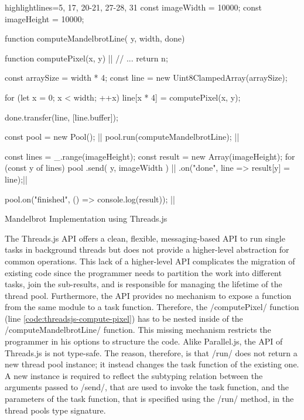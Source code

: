 \begin{listing}
	\begin{javascriptcode*}{highlightlines={5, 17, 20-21, 27-28, 31}}
const imageWidth = 10000;
const imageHeight = 10000;

function computeMandelbrotLine({ y, width}, done) {
	function computePixel(x, y) {|$\label{code:threadsjs-compute-pixel}$|
		// ...
		return n;
	}
	
	const arraySize = width * 4;
	const line = new Uint8ClampedArray(arraySize);

	for (let x = 0; x < width; ++x) {
		line[x * 4] = computePixel(x, y);
	}

	done.transfer(line, [line.buffer]);
}

const pool = new Pool(); |$\label{code:threadsjs-pool}$|
pool.run(computeMandelbrotLine); |$\label{code:threadsjs-worker}$|

const lines = _.range(imageHeight);
const result = new Array(imageHeight);
for (const y of lines) {
	pool
		.send({ y, imageWidth }) |$\label{code:threadsjs-messaging}$|
		.on("done", line => result[y] = line);|$\label{code:threadsjs-task-completion}$|
}

pool.on("finished", () => console.log(result)); |$\label{code:threadsjs-done}$|
\end{javascriptcode*}
\caption{Mandelbrot Implementation using Threads.js}
\label{fig:mandelbrot-threadsjs}
\end{listing}


The Threads.js API offers a clean, flexible, messaging-based API to run single tasks in background threads but does not provide a higher-level abstraction for common operations. This lack of a higher-level API complicates the migration of existing code since the programmer needs to partition the work into different tasks, join the sub-results, and is responsible for managing the lifetime of the thread pool. Furthermore, the API provides no mechanism to expose a function from the same module to a task function. Therefore, the \javascriptinline/computePixel/ function (line \ref{code:threadsjs-compute-pixel}) has to be nested inside of the \javascriptinline/computeMandelbrotLine/ function. This missing mechanism restricts the programmer in his options to structure the code. Alike Parallel.js, the API of Threads.js is not type-safe. The reason, therefore, is that \javascriptinline/run/ does not return a new thread pool instance; it instead changes the task function of the existing one. A new instance is required to reflect the subtyping relation between the arguments passed to \javascriptinline/send/, that are used to invoke the task function, and the parameters of the task function, that is specified using the \javascriptinline/run/ method, in the thread pools type signature.

